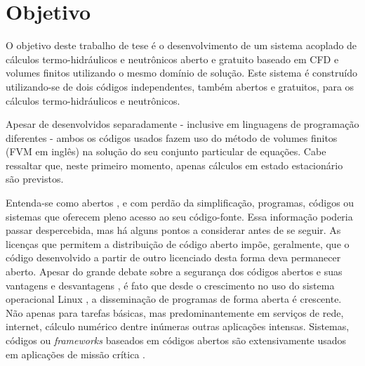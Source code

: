 


\section{Objetivo}

O objetivo deste trabalho de tese é o desenvolvimento de um sistema acoplado de cálculos
termo-hidráulicos e neutrônicos aberto e gratuito baseado em CFD e volumes finitos utilizando
o mesmo domínio de solução. Este sistema é construído utilizando-se de dois códigos independentes, também
abertos e gratuitos, para os cálculos termo-hidráulicos e neutrônicos. 

Apesar de desenvolvidos separadamente - inclusive
em linguagens de programação diferentes - ambos os códigos usados fazem uso do método de volumes
finitos \cite{Eymard2003} (FVM em inglês) na solução do seu conjunto particular de equações.
Cabe ressaltar que, neste primeiro momento, apenas cálculos em estado estacionário
são previstos.

Entenda-se como abertos \cite[Capítulo~3]{Stallman2002}, e com perdão da simplificação, programas, códigos ou sistemas
que oferecem pleno acesso ao seu código-fonte. Essa informação poderia passar despercebida,
mas há alguns pontos a considerar antes de se
seguir. As licenças que permitem a distribuição de código aberto impõe, geralmente, que
o código desenvolvido a partir de outro licenciado desta forma deva permanecer aberto.
Apesar do grande debate sobre a segurança dos códigos abertos e suas vantagens e desvantagens \cite[Seção~2.6]{Androutsellis2010},
é fato que desde o crescimento no uso do sistema operacional Linux \cite{LinuxBritannica}, a disseminação de programas de forma aberta é crescente.
Não apenas para tarefas básicas, mas predominantemente em serviços de rede, internet, cálculo numérico dentre
inúmeras outras aplicações intensas. Sistemas, códigos ou \textit{frameworks} baseados em códigos abertos são
extensivamente usados em aplicações de missão crítica \cite{Norris2004}.

